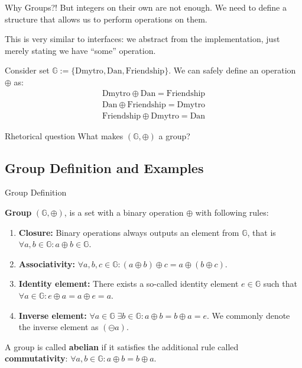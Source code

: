 \documentclass{zkdl-presentation-template}
\begin{document}
    \begin{frame}{Why Groups?!}
        But integers on their own are not enough. We need to define a structure that allows us to perform operations on them.

        This is very similar to interfaces: we abstract from the implementation, just merely stating we have ``some'' operation.

        \begin{example}
            Consider set $\mathbb{G} := \{\text{Dmytro}, \text{Dan}, \text{Friendship}\}$. We can safely define an operation $\oplus$ as:
            \begin{gather*}
                \text{Dmytro} \oplus \text{Dan} = \text{Friendship} \\ 
                \text{Dan} \oplus \text{Friendship} = \text{Dmytro} \\
                \text{Friendship} \oplus \text{Dmytro} = \text{Dan}
            \end{gather*}
        \end{example}
        \pause

        \begin{questionblock}{Rhetorical question}
            What makes $(\mathbb{G}, \oplus)$ a group?
        \end{questionblock}
    \end{frame}
    \subsection{Group Definition and Examples}
    \begin{frame}{Group Definition}
      \begin{definition}
        \textbf{Group} $(\mathbb{G}, \oplus)$, is a set with a binary operation $\oplus$ with following rules:
        \begin{enumerate}
            \item \textbf{Closure:} Binary operations always outputs an element from $\mathbb{G}$, that is $\forall a,b \in \mathbb{G}: a \oplus b \in \mathbb{G}$.\pause
            \item \textbf{Associativity:} $\forall a,b,c \in \mathbb{G}: (a \oplus b)\oplus c = a \oplus (b \oplus c)$.\pause
            \item \textbf{Identity element:} There exists a so-called identity element $e \in \mathbb{G}$ such that $\forall a \in \mathbb{G}: e \oplus a = a \oplus e = a$.\pause
            \item \textbf{Inverse element:} $\forall a \in \mathbb{G} \; \exists b \in \mathbb{G}: a\oplus b = b \oplus a = e$. We commonly denote the inverse element as $(\ominus a)$. \pause
        \end{enumerate}
    \end{definition}

    \begin{definition}
        A group is called \textbf{abelian} if it satisfies the additional rule called \textbf{commutativity}: $\forall a,b \in \mathbb{G}: a \oplus b = b \oplus a$.
    \end{definition}
    \end{frame}
\end{document}
